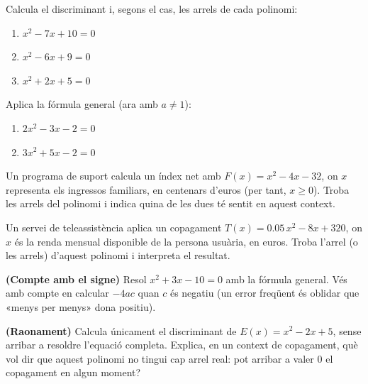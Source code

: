 \begin{exercicis}
\begin{exlist}
  \item Calcula el discriminant i, segons el cas, les arrels de cada
        polinomi:
    \begin{enumerate}[label=\alph*), leftmargin=1.6em, topsep=2pt]
      \item $x^2-7x+10=0$
      \item $x^2-6x+9=0$
      \item $x^2+2x+5=0$
    \end{enumerate}

  \item Aplica la fórmula general (ara amb $a\neq1$):
    \begin{enumerate}[label=\alph*), leftmargin=1.6em, topsep=2pt]
      \item $2x^2-3x-2=0$
      \item $3x^2+5x-2=0$
    \end{enumerate}

  \item Un programa de suport calcula un índex net amb
        $F(x)=x^2-4x-32$, on $x$ representa els ingressos familiars, en
        centenars d'euros (per tant, $x\geq0$). Troba les arrels del
        polinomi i indica quina de les dues té sentit en aquest context.

  \item Un servei de teleassistència aplica un copagament
        $T(x)=\num{0,05}\,x^2-8x+320$, on $x$ és la renda mensual
        disponible de la persona usuària, en euros. Troba l'arrel (o les
        arrels) d'aquest polinomi i interpreta el resultat.

  \item \textbf{(Compte amb el signe)} Resol $x^2+3x-10=0$ amb la fórmula
        general. Vés amb compte en calcular $-4ac$ quan $c$ és negatiu (un
        error freqüent és oblidar que «menys per menys» dona positiu).

  \item \textbf{(Raonament)} Calcula únicament el discriminant de
        $E(x)=x^2-2x+5$, sense arribar a resoldre l'equació completa.
        Explica, en un context de copagament, què vol dir que aquest
        polinomi no tingui cap arrel real: pot arribar a valer $0$ el
        copagament en algun moment?
\end{exlist}
\end{exercicis}

